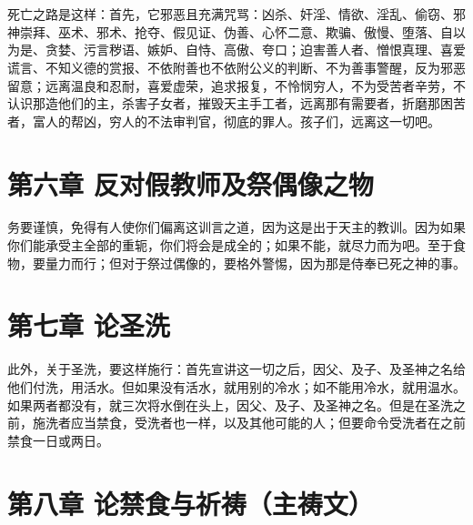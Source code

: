 
\section{}

死亡之路是这样：首先，它邪恶且充满咒骂：凶杀、奸淫、情欲、淫乱、偷窃、邪神崇拜、巫术、邪术、抢夺、假见证、伪善、心怀二意、欺骗、傲慢、堕落、自以为是、贪婪、污言秽语、嫉妒、自恃、高傲、夸口；迫害善人者、憎恨真理、喜爱谎言、不知义德的赏报、不依附善也不依附公义的判断、不为善事警醒，反为邪恶留意；远离温良和忍耐，喜爱虚荣，追求报复，不怜悯穷人，不为受苦者辛劳，不认识那造他们的主，杀害子女者，摧毁天主手工者，远离那有需要者，折磨那困苦者，富人的帮凶，穷人的不法审判官，彻底的罪人。孩子们，远离这一切吧。\par


\section{第六章 反对假教师及祭偶像之物}

务要谨慎，免得有人使你们偏离这训言之道，因为这是出于天主的教训。因为如果你们能承受主全部的重轭，你们将会是成全的；如果不能，就尽力而为吧。至于食物，要量力而行；但对于祭过偶像的，要格外警惕，因为那是侍奉已死之神的事。\par


\section{第七章 论圣洗}

此外，关于圣洗，要这样施行：首先宣讲这一切之后，因父、及子、及圣神之名给他们付洗，用活水。但如果没有活水，就用别的冷水；如不能用冷水，就用温水。如果两者都没有，就三次将水倒在头上，因父、及子、及圣神之名。但是在圣洗之前，施洗者应当禁食，受洗者也一样，以及其他可能的人；但要命令受洗者在之前禁食一日或两日。\par


\section{第八章 论禁食与祈祷（主祷文）}

